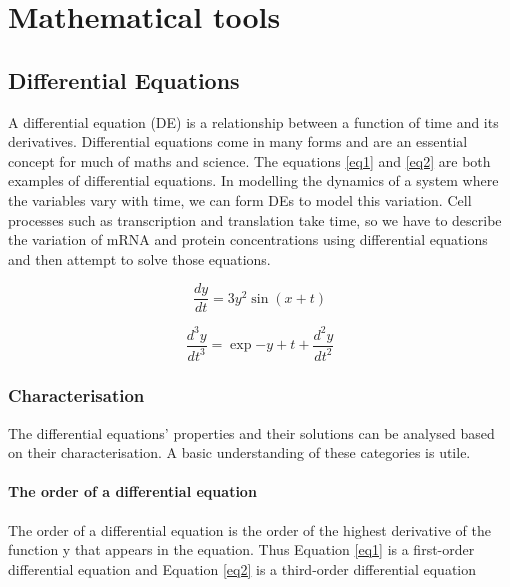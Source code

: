 \documentclass[11pt, letterpaper, english]{article}
\begin{document}
\newpage

\section{Mathematical tools}

\subsection{Differential Equations}

\par{A differential equation (DE) is a relationship between a function of time and its derivatives. Differential equations come in many forms and are an essential concept for much of maths and science. The equations \ref{eq1} and \ref{eq2} are both examples of differential equations. In modelling the dynamics of a system where the variables vary with time, we can form DEs to model this variation. Cell processes such as transcription and translation take time, so we have to describe the variation of mRNA and protein concentrations using differential equations and then attempt to solve those equations.}

\begin{equation}
    \frac{d y}{d t}=3 y^2 \sin{\left( x+t  \right)}
    \label{eq1}
\end{equation}

\begin{equation}
    \frac{d^3 y}{{d t}^3}=\exp{-y} + t + \frac{d^2 y}{{d t}^2}
    \label{eq2}
\end{equation}

\subsubsection{Characterisation}
\par{The differential equations' properties and their solutions can be analysed based on their characterisation. A basic understanding of these categories is utile.}

    \paragraph{The order of a differential equation}
    
    \par{The order of a differential equation is the order of the highest derivative of the function y that appears in the equation. Thus Equation \ref{eq1} is a first-order differential equation and Equation \ref{eq2} is a third-order differential equation}
    
\end{document}

